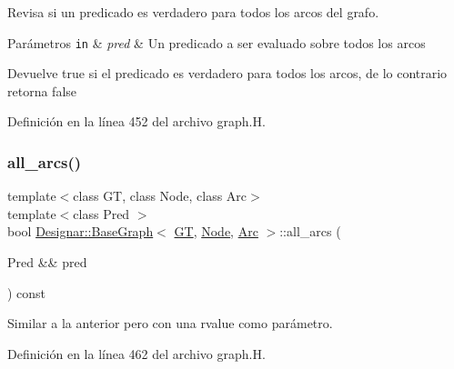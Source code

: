 Revisa si un predicado es verdadero para todos los arcos del grafo. 


\begin{DoxyParams}[1]{Parámetros}
\mbox{\tt in}  & {\em pred} & Un predicado a ser evaluado sobre todos los arcos \\
\hline
\end{DoxyParams}
\begin{DoxyReturn}{Devuelve}
{\ttfamily true} si el predicado es verdadero para todos los arcos, de lo contrario retorna {\ttfamily false} 
\end{DoxyReturn}


Definición en la línea 452 del archivo graph.\+H.

\mbox{\label{class_designar_1_1_base_graph_aea71a873faf7e92195d582b21d14c347}} 
\subsubsection{\texorpdfstring{all\+\_\+arcs()}{all\_arcs()}\hspace{0.1cm}{\footnotesize\ttfamily [2/2]}}
{\footnotesize\ttfamily template$<$class GT, class Node, class Arc$>$ \\
template$<$class Pred $>$ \\
bool \hyperlink{class_designar_1_1_base_graph}{Designar\+::\+Base\+Graph}$<$ \hyperlink{demo-buildgraph_8_c_a3001c40d2c31ca87ed96cd7d1334a55e}{GT}, \hyperlink{namespace_designar_a5af326c65aa2bd26b26c410f2030d09e}{Node}, \hyperlink{namespace_designar_a3f55fb5513d62ff47cbc8f72b8e95d6f}{Arc} $>$\+::all\+\_\+arcs (\begin{DoxyParamCaption}\item[{Pred \&\&}]{pred }\end{DoxyParamCaption}) const\hspace{0.3cm}{\ttfamily [inline]}}



Similar a la anterior pero con una rvalue como parámetro. 



Definición en la línea 462 del archivo graph.\+H.

\mbox{\label{class_designar_1_1_base_graph_abad9513273c1096aba652e211180061c}} 
